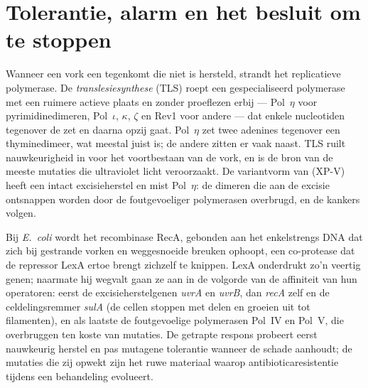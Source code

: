 \section{Tolerantie, alarm en het besluit om te stoppen}

\begin{definition}[Translesiesynthese]\label{def:b3:dna-repair:tls}
Wanneer een vork een  tegenkomt die niet is hersteld, strandt het
replicatieve polymerase. De \emph{translesiesynthese} (TLS) roept een
gespecialiseerd polymerase met een ruimere actieve plaats en zonder
proeflezen erbij --- Pol~$\eta$ voor pyrimidinedimeren, Pol~$\iota$,
$\kappa$, $\zeta$ en Rev1 voor andere  --- dat enkele
nucleotiden tegenover de  zet en daarna opzij gaat. Pol~$\eta$
zet twee adenines tegenover een thyminedimeer, wat meestal juist is;
de andere zitten er vaak naast. TLS ruilt nauwkeurigheid in voor het
voortbestaan van de vork, en is de bron van de meeste mutaties die
ultraviolet licht veroorzaakt. De variantvorm van  (XP-V) heeft een intact excisieherstel en mist
Pol~$\eta$: de dimeren die aan de excisie ontsnappen worden door de
foutgevoeliger polymerasen overbrugd, en de kankers volgen.
\end{definition}

\begin{proposition}\label{prop:b3:dna-repair:sos}
Bij \emph{E.~coli} wordt het recombinase RecA, gebonden aan het
enkelstrengs DNA dat zich bij gestrande vorken en weggesnoeide breuken
ophoopt, een co-protease dat de repressor LexA ertoe brengt zichzelf te
knippen. LexA onderdrukt zo'n veertig genen; naarmate hij wegvalt gaan
ze aan in de volgorde van de affiniteit van hun operatoren: eerst de
excisieherstelgenen \emph{uvrA} en \emph{uvrB}, dan \emph{recA} zelf en
de celdelingsremmer \emph{sulA} (de cellen stoppen met delen en groeien
uit tot filamenten), en als laatste de foutgevoelige polymerasen
Pol~IV en Pol~V, die  overbruggen ten koste van mutaties. De
getrapte respons probeert eerst nauwkeurig herstel en pas mutagene
tolerantie wanneer de schade aanhoudt; de mutaties die zij opwekt zijn
het ruwe materiaal waarop antibioticaresistentie tijdens een
behandeling evolueert.
\end{proposition}

